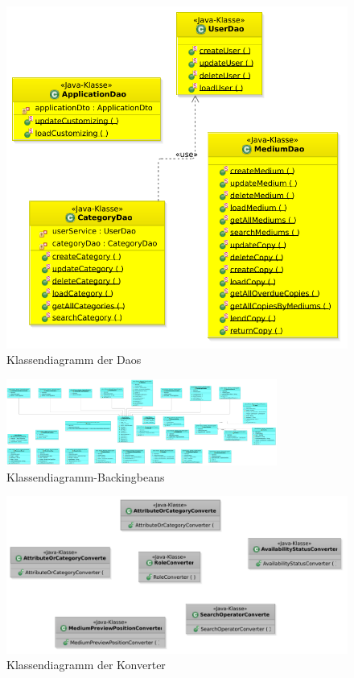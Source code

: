 \documentclass{article}
\begin{document}
\begin{figure}[H]
\hypertarget{DAOs}{}
		\centering
		\includegraphics[width = 45em]{KlassendiagrammDaos}
		\caption{Klassendiagramm der Daos}
	\end{figure}

\begin{figure}[H]
\hypertarget{Usersession}{}
		\centering
		\includegraphics[angle=270, width=24em]{Klassendiagramm-Backingbeans}
		\caption{Klassendiagramm-Backingbeans}
	\end{figure}




\begin{figure}[H]
		\centering
		\includegraphics[width = 52em]{Klassendiagramm-Convertors}
		\caption{Klassendiagramm der Konverter}
	\end{figure}
\end{document}
